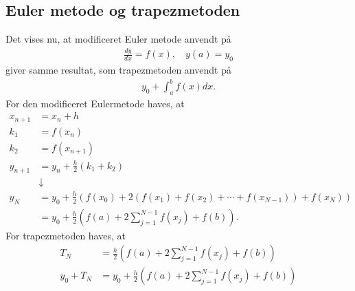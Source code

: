 \subsection*{Euler metode og trapezmetoden}
%
Det vises nu, at modificeret Euler metode anvendt på
\begin{align*}
\frac{dy}{dx}=f(x),\phantom{hi}y(a)=y_0
\end{align*}
%
giver samme resultat, som trapezmetoden anvendt på
%
\begin{align*}
y_0 + \int_a^b f(x) dx.
\end{align*}
%
For den modificeret Eulermetode haves, at
%
\begin{align*}
x_{n+1} &= x_n + h\\
k_1 &= f(x_n)\\
k_2 &= f(x_{n+1} )\\
y_{n+1} &= y_n + \frac{h}{2}(k_1 + k_2)\\
&\downarrow\\
y_N &= y_0 + \frac{h}{2}\left( f(x_0) + 2(f(x_1) + f(x_2) + \cdots + f(x_{N-1})) + f(x_N) \right)\\
 &= y_0 + \frac{h}{2}\left(f(a) + 2\sum_{j=1}^{N-1}f(x_j) + f(b)\right).
\end{align*}
%
For trapezmetoden haves, at
%
\begin{align*}
T_N &= \frac{h}{2} \left(f(a) + 2\sum_{j=1}^{N-1} f(x_j) + f(b) \right)\\
y_0 + T_N  &= y_0 + \frac{h}{2} \left(f(a) + 2\sum_{j=1}^{N-1} f(x_j) + f(b) \right)
\end{align*}